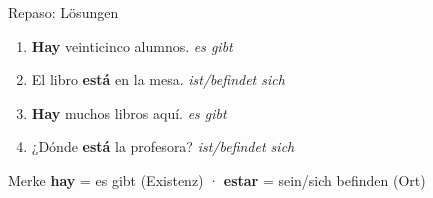 \documentclass[aspectratio=169, 11pt]{beamer}
\newcommand{\de}[1]{\textit{\textcolor{mittelgrau}{#1}}}
\begin{document}
\begin{frame}{Repaso: Lösungen}
    \vspace{0.5cm}

    \begin{enumerate}
        \setlength{\itemsep}{0.5cm}
        \item \textcolor{richtig}{\textbf{Hay}} veinticinco alumnos. \de{es gibt}
        \item El libro \textcolor{richtig}{\textbf{está}} en la mesa. \de{ist/befindet sich}
        \item \textcolor{richtig}{\textbf{Hay}} muchos libros aquí. \de{es gibt}
        \item ¿Dónde \textcolor{richtig}{\textbf{está}} la profesora? \de{ist/befindet sich}
    \end{enumerate}

    \vspace{0.8cm}

    \begin{block}{Merke}
        \textbf{hay} = es gibt (Existenz) · \textbf{estar} = sein/sich befinden (Ort)
    \end{block}
\end{frame}

\end{document}
